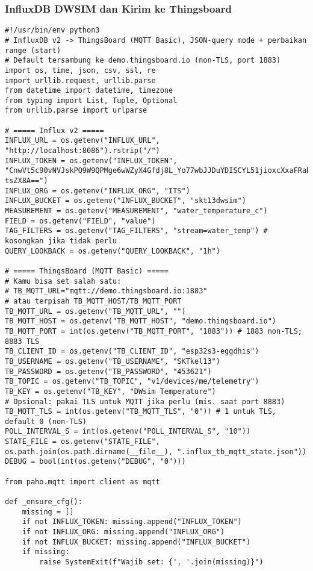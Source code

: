 \documentclass[a4paper, 12pt]{article}
\begin{document}
\subsubsection{InfluxDB DWSIM dan Kirim ke Thingsboard}
\begin{lstlisting}[style=pythonstyle, caption={InfluxDB DWSIM dan Kirim ke Thingsboard (python)}]
#!/usr/bin/env python3
# InfluxDB v2 -> ThingsBoard (MQTT Basic), JSON-query mode + perbaikan range (start)
# Default tersambung ke demo.thingsboard.io (non-TLS, port 1883)
import os, time, json, csv, ssl, re
import urllib.request, urllib.parse
from datetime import datetime, timezone
from typing import List, Tuple, Optional
from urllib.parse import urlparse

# ===== Influx v2 =====
INFLUX_URL = os.getenv("INFLUX_URL", "http://localhost:8086").rstrip("/")
INFLUX_TOKEN = os.getenv("INFLUX_TOKEN", "CnwVt5c90vNVJskPQ9W9QPMge6wWZyX4Gfdj8L_Yo77wbJJDuYDISCYL51jioxcXxaFRaPp-tsZX8A==")
INFLUX_ORG = os.getenv("INFLUX_ORG", "ITS")
INFLUX_BUCKET = os.getenv("INFLUX_BUCKET", "skt13dwsim")
MEASUREMENT = os.getenv("MEASUREMENT", "water_temperature_c")
FIELD = os.getenv("FIELD", "value")
TAG_FILTERS = os.getenv("TAG_FILTERS", "stream=water_temp") # kosongkan jika tidak perlu
QUERY_LOOKBACK = os.getenv("QUERY_LOOKBACK", "1h")

# ===== ThingsBoard (MQTT Basic) =====
# Kamu bisa set salah satu:
# TB_MQTT_URL="mqtt://demo.thingsboard.io:1883"
# atau terpisah TB_MQTT_HOST/TB_MQTT_PORT
TB_MQTT_URL = os.getenv("TB_MQTT_URL", "")
TB_MQTT_HOST = os.getenv("TB_MQTT_HOST", "demo.thingsboard.io")
TB_MQTT_PORT = int(os.getenv("TB_MQTT_PORT", "1883")) # 1883 non-TLS; 8883 TLS
TB_CLIENT_ID = os.getenv("TB_CLIENT_ID", "esp32s3-eggdhis")
TB_USERNAME = os.getenv("TB_USERNAME", "SKTkel13")
TB_PASSWORD = os.getenv("TB_PASSWORD", "453621")
TB_TOPIC = os.getenv("TB_TOPIC", "v1/devices/me/telemetry")
TB_KEY = os.getenv("TB_KEY", "DWsim Temperature")
# Opsional: pakai TLS untuk MQTT jika perlu (mis. saat port 8883)
TB_MQTT_TLS = int(os.getenv("TB_MQTT_TLS", "0")) # 1 untuk TLS, default 0 (non-TLS)
POLL_INTERVAL_S = int(os.getenv("POLL_INTERVAL_S", "10"))
STATE_FILE = os.getenv("STATE_FILE", os.path.join(os.path.dirname(__file__), ".influx_tb_mqtt_state.json"))
DEBUG = bool(int(os.getenv("DEBUG", "0")))

from paho.mqtt import client as mqtt

def _ensure_cfg():
    missing = []
    if not INFLUX_TOKEN: missing.append("INFLUX_TOKEN")
    if not INFLUX_ORG: missing.append("INFLUX_ORG")
    if not INFLUX_BUCKET: missing.append("INFLUX_BUCKET")
    if missing:
        raise SystemExit(f"Wajib set: {', '.join(missing)}")


\end{lstlisting}
\end{document}
